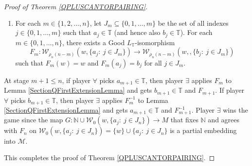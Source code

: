 \documentclass[10pt,a4paper, openany,  oldfontcommands]{memoir}
\newtheorem{open problem} [theorem] {Open Problem}
\newtheorem{open question} [theorem] {Open Question}
\begin{document}
\begin{proof}[Proof of  Theorem  \ref{QPLUSCANTORPAIRING}]
\begin{enumerate}
\item  For each  $  m  \in  \lbrace 1, 2,  \ldots ,  n  \rbrace  $, 
    let   $ J_m    \subseteq   \lbrace  0, 1,  \ldots ,  m  \rbrace  $  be the set of all indexes  $  j  \in     \lbrace 0, 1,  \ldots ,  m  \rbrace $  such that  $  a_j  \in  \mathbb{T} $   (and hence  also $  b_j  \in    \mathbb{T}  $).
    For each  $ m    \in   \lbrace 0, 1,  \ldots ,  n  \rbrace   $, 
  there exists  a  \textsf{Good} $  L_{  \mathbb{T} } $-isomorphism 
\[
   F_m   : \mathcal{W}_{  \rho_n  \left(  n -m  \right)  }  \left(   w ,      \lbrace  a_j  :   \  j  \in  J_m  \rbrace   \right) 
  \to 
 \mathcal{W}_{  \rho_n  \left(  n -m  \right)  }  \left(    w, ,      \lbrace  b_j  :   \  j  \in  J_m  \rbrace   \right)    
     \] 
such that    $    F_m  \left(   w \right)  =  w    $  and    $   F_m  \left(   a_j    \right)  =  b_j   $  for all   $  j  \in J_m   $. 
\end{enumerate}
At stage  $m+1  \leq  n $, if player  $  \forall  $  picks  $  a_{ m+1}  \in  \mathbb{T} $, 
then  player  $  \exists  $  applies  $  F_m  $  to Lemma \ref{SectionQFirstExtensionLemma}   and gets  $  b_{ m+1} \in \mathbb{T} $  and  $  F_{m+1} $. 
If  player  $  \forall  $  picks  $  b_{ m+1}  \in  \mathbb{T} $, 
then  player  $  \exists  $  applies  $  F_m^{-1}  $  to Lemma  \ref{SectionQFirstExtensionLemma}  and gets  $  a_{ m+1}  \in \mathbb{T}  $  and  $  F_{m+1}^{-1} $. 
Player $  \exists  $  wins the game since  
the map  $  G  :  \mathbb{N}  \cup   \mathcal{W}_{ 0 }  \left(     w,   \lbrace  a_j  :   \  j  \in  J_n  \rbrace    \right)   \to  M  $  
that  fixes    $  \mathbb{N}    $  and agrees with  $  F_n  $  on 
$   \mathcal{W}_{ 0 }  \left(    w,      \lbrace  a_j  :   \  j  \in  J_n  \rbrace   \right)   =  
\lbrace  w  \rbrace  \cup   \lbrace  a_j  :   \  j  \in  J_n  \rbrace        $
  is a partial embedding   into   $  \mathcal{M}  $. 
  



This completes the proof of    Theorem  \ref{QPLUSCANTORPAIRING}. 
\end{proof}
\end{document}
